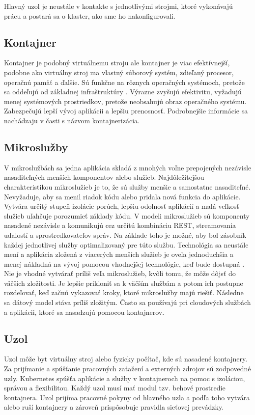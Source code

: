 Hlavný uzol je neustále v kontakte s jednotlivými strojmi, ktoré vykonávajú prácu a postará sa o klaster, ako sme ho nakonfigurovali.

\subsection*{Kontajner}
Kontajner je podobný virtuálnemu stroju ale kontajner je viac efektívnejší, podobne ako virtuálny stroj ma vlastný súborový systém, zdieľaný procesor, operačnú pamäť a ďalšie. Sú funkčne na rôznych operačných systémoch, pretože sa oddeľujú od základnej infraštruktúry \cite{kubernetes}.
Výrazne zvyšujú efektivitu, vyžadujú menej systémových prostriedkov, pretože neobsahujú obraz operačného systému. Zabezpečujú lepší vývoj aplikácii a lepšiu prenosnosť. Podrobnejšie informácie sa nachádzaju v časti s názvom kontajnerizácia.

\subsection*{Mikroslužby}
V mikroslužbách sa jedna aplikácia skladá z mnohých voľne prepojených nezávisle nasaditeľných menších komponentov alebo služieb. Najdôležitejšou charakteristikou mikroslužieb je to, že sú služby menšie a samostatne nasaditeľné. Nevyžaduje, aby sa menil riadok kódu alebo pridala nová funkcia do aplikácie. Vytvára určitý stupeň izolácie porúch, lepšiu odolnosť aplikácií a malá veľkosť služieb uľahčuje porozumieť základy kódu. V modeli mikroslužieb sú komponenty nasadené nezávisle a komunikujú cez určitú kombináciu REST, streamovania udalostí a sprostredkovateľov správ. Na základe toho je možné, aby bol zásobník každej jednotlivej služby optimalizovaný pre túto službu. Technológia sa neustále mení a aplikácia zložená z viacerých menších služieb je oveľa jednoduchšia a menej nákladná na vývoj pomocou vhodnejšej technológie, keď bude dostupná \cite{microibm}. Nie je vhodné vytvárať príliš veľa mikroslužieb, kvôli tomu, že môže dôjsť do väčších zložitosti. Je lepšie prikloniť sa k väčším službám a potom ich postupne rozdeľovať, keď začnú vykazovať kroky, ktoré mikroslužby majú riešiť. Následne sa dátový model stáva príliš zložitým. Často sa používajú pri cloudových službách a aplikácii, ktoré sa nasadzujú pomocou kontajnerov.

\subsection*{Uzol}
Uzol môže byt virtuálny stroj alebo fyzicky počítač, kde sú nasadené kontajnery. Za prijímanie a spúšťanie pracovných zaťažení a externých zdrojov sú zodpovedné uzly. Kubernetes spúšťa aplikácie a služby v kontajneroch na pomoc s izoláciou, správou a flexibilitou. Každý uzol musí mať modul tzv. behové prostredie kontajnera. Uzol prijíma pracovné pokyny od hlavného uzla a podľa toho vytvára alebo ruší kontajnery a zároveň prispôsobuje pravidla sieťovej prevádzky.

